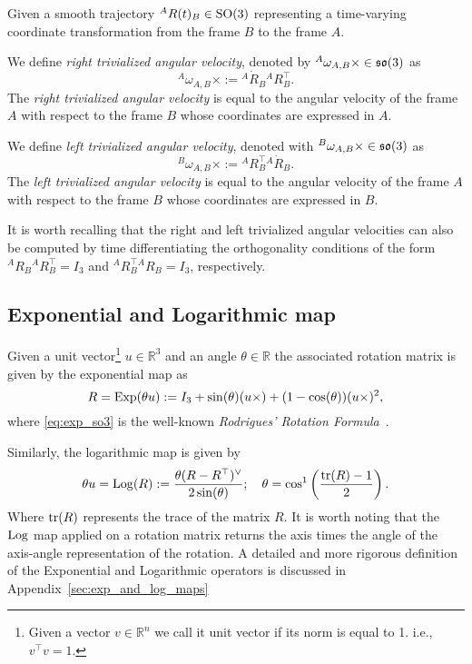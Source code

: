 Given a smooth trajectory ${}^A R(t) _B \in \mathrm{SO}(3)$ representing a time-varying coordinate transformation from the frame $B$ to the frame $A$. 
\par
We define \emph{right trivialized angular velocity}, denoted by ${}^A \omega _{A,B} \times \in \mathfrak{so}(3)$ as
\begin{equation}
    \label{eq:so3_right}
    {}^A \omega _{A,B} \times := {}^A \dot{R} _B  {}^A R _B ^\top.
\end{equation}
The \emph{right trivialized angular velocity} is equal to the angular velocity of the frame $A$ with respect to the frame $B$ whose coordinates are expressed in $A$.
\par
We define \emph{left trivialized angular velocity}, denoted with ${}^B \omega _{A,B} \times \in \mathfrak{so}(3)$ as
\begin{equation}
    \label{eq:so3_left}
    {}^B \omega _{A,B} \times := {}^A R _B ^\top  {}^A \dot{R} _B. 
\end{equation}
The \emph{left trivialized angular velocity} is equal to the angular velocity of the frame $A$ with respect to the frame $B$ whose coordinates are expressed in $B$.
\par
It is worth recalling that the right and left trivialized angular velocities can also be computed by time differentiating the orthogonality conditions of the form ${}^A R _B  {}^A R _B ^\top = I_3$ and ${}^A R _B ^\top {}^A R _B = I_3$, respectively. 




\subsection{Exponential and Logarithmic map\label{sec:so3_exponential_log}}
Given a unit vector\footnote{Given a vector $v\in\mathbb{R}^n$ we call it unit vector if its norm is equal to 1. i.e., $v^\top v = 1$.} $u\in\mathbb{R}^3$ and an angle $\theta\in\mathbb{R}$ the associated rotation matrix is given by the exponential map as
\begin{equation}
    \label{eq:exp_so3}
    R = \operatorname{Exp}(\theta u) := I_3 + \sin(\theta) (u \times) + (1 - \cos(\theta)) (u \times) ^2,
\end{equation}
where \eqref{eq:exp_so3} is the well-known \emph{Rodrigues' Rotation Formula}~\citep{Murray1994}.
\par
Similarly, the logarithmic map is given by
\begin{equation}
    \label{eq:log_so3}
    \theta u = \operatorname{Log}(R) := \frac{\theta(R - R^\top) ^ \vee}{ 2 \sin(\theta)}; \quad \theta = \cos^{1} \left(\frac{\operatorname{tr}(R) - 1 }{2}\right).
\end{equation}
Where $\operatorname{tr}(R)$ represents the trace of the matrix $R$. It is worth noting that the $\operatorname{Log}$ map applied on a rotation matrix returns the axis times the angle of the axis-angle representation of the rotation. 
A detailed and more rigorous definition of the Exponential and Logarithmic operators is discussed in Appendix~\ref{sec:exp_and_log_maps}



